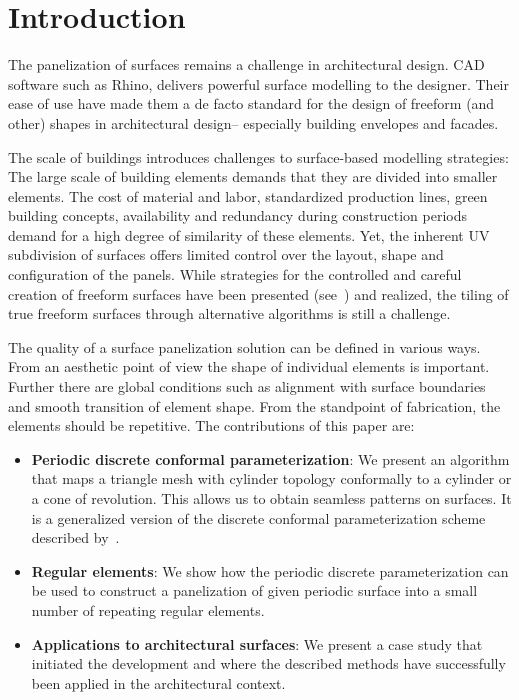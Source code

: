 \documentclass[article.tex]{subfiles}
\begin{document}

\section{Introduction}
\label{sec:introduction}

The panelization of surfaces remains a challenge in architectural
design. CAD software such as Rhino, delivers powerful \nurbs surface
modelling to the designer. Their ease of use have made them a de facto
standard for the design of freeform (and other) shapes in
architectural design– especially building envelopes and facades.  

The scale of buildings introduces challenges to surface-based
modelling strategies: The large scale of building elements demands
that they are divided into smaller elements. The cost of material and
labor, standardized production lines, green building concepts,
availability and redundancy during construction periods demand for a
high degree of similarity of these elements. Yet, the inherent
UV subdivision of \nurbs surfaces offers limited control over the
layout, shape and configuration of the panels. While strategies for
the controlled and careful creation of freeform surfaces have been
presented (see~\cite{Ceccato}) and realized, the tiling of true
freeform surfaces through alternative algorithms is still a challenge.

The quality of a surface panelization solution can be defined in
various ways. From an aesthetic point of view the shape of individual
elements is important. Further there are global conditions such as
alignment with surface boundaries and smooth transition of element
shape. From the standpoint of fabrication, the elements should be
repetitive. The contributions of this paper are:

\begin{itemize}
\item {\bf Periodic discrete conformal parameterization}:
  We present an algorithm that maps a triangle mesh with cylinder
  topology conformally to a cylinder or a cone of revolution. This
  allows us to obtain seamless patterns on surfaces. It is a
  generalized version of the discrete conformal parameterization
  scheme described by~\cite{SSP08}.
\item {\bf Regular elements}:
  We show how the periodic discrete parameterization can be used to
  construct a panelization of given periodic surface into a small
  number of repeating regular elements.
\item {\bf Applications to architectural surfaces}: 
  We present a case study that initiated the development and where the
  described methods have successfully been applied in the architectural
  context.
\end{itemize}
\end{document}
